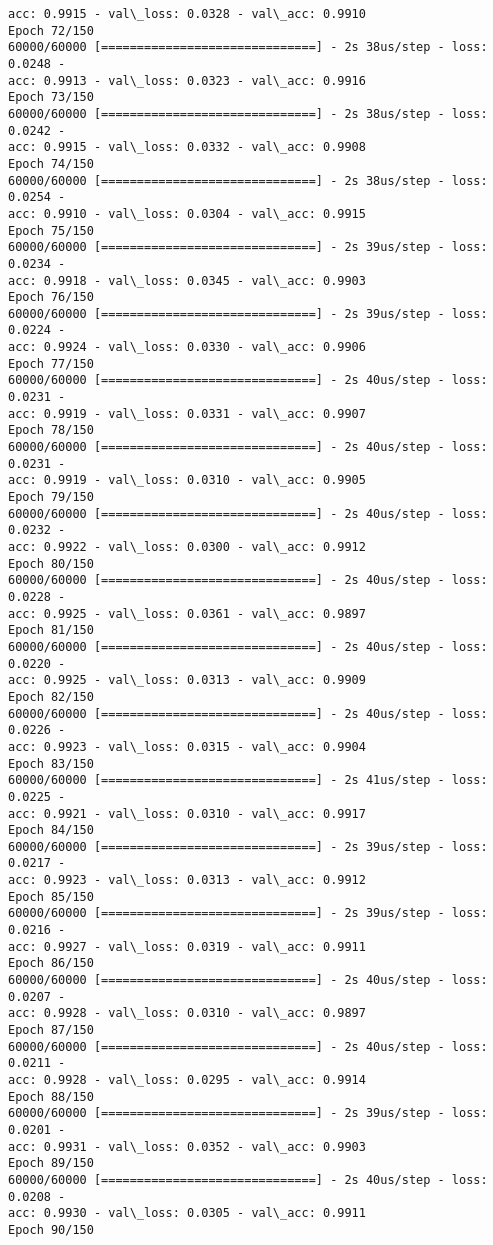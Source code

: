\documentclass[11pt]{article}
\begin{document}
\begin{Verbatim}[commandchars=\\\{\}]
acc: 0.9915 - val\_loss: 0.0328 - val\_acc: 0.9910
Epoch 72/150
60000/60000 [==============================] - 2s 38us/step - loss: 0.0248 -
acc: 0.9913 - val\_loss: 0.0323 - val\_acc: 0.9916
Epoch 73/150
60000/60000 [==============================] - 2s 38us/step - loss: 0.0242 -
acc: 0.9915 - val\_loss: 0.0332 - val\_acc: 0.9908
Epoch 74/150
60000/60000 [==============================] - 2s 38us/step - loss: 0.0254 -
acc: 0.9910 - val\_loss: 0.0304 - val\_acc: 0.9915
Epoch 75/150
60000/60000 [==============================] - 2s 39us/step - loss: 0.0234 -
acc: 0.9918 - val\_loss: 0.0345 - val\_acc: 0.9903
Epoch 76/150
60000/60000 [==============================] - 2s 39us/step - loss: 0.0224 -
acc: 0.9924 - val\_loss: 0.0330 - val\_acc: 0.9906
Epoch 77/150
60000/60000 [==============================] - 2s 40us/step - loss: 0.0231 -
acc: 0.9919 - val\_loss: 0.0331 - val\_acc: 0.9907
Epoch 78/150
60000/60000 [==============================] - 2s 40us/step - loss: 0.0231 -
acc: 0.9919 - val\_loss: 0.0310 - val\_acc: 0.9905
Epoch 79/150
60000/60000 [==============================] - 2s 40us/step - loss: 0.0232 -
acc: 0.9922 - val\_loss: 0.0300 - val\_acc: 0.9912
Epoch 80/150
60000/60000 [==============================] - 2s 40us/step - loss: 0.0228 -
acc: 0.9925 - val\_loss: 0.0361 - val\_acc: 0.9897
Epoch 81/150
60000/60000 [==============================] - 2s 40us/step - loss: 0.0220 -
acc: 0.9925 - val\_loss: 0.0313 - val\_acc: 0.9909
Epoch 82/150
60000/60000 [==============================] - 2s 40us/step - loss: 0.0226 -
acc: 0.9923 - val\_loss: 0.0315 - val\_acc: 0.9904
Epoch 83/150
60000/60000 [==============================] - 2s 41us/step - loss: 0.0225 -
acc: 0.9921 - val\_loss: 0.0310 - val\_acc: 0.9917
Epoch 84/150
60000/60000 [==============================] - 2s 39us/step - loss: 0.0217 -
acc: 0.9923 - val\_loss: 0.0313 - val\_acc: 0.9912
Epoch 85/150
60000/60000 [==============================] - 2s 39us/step - loss: 0.0216 -
acc: 0.9927 - val\_loss: 0.0319 - val\_acc: 0.9911
Epoch 86/150
60000/60000 [==============================] - 2s 40us/step - loss: 0.0207 -
acc: 0.9928 - val\_loss: 0.0310 - val\_acc: 0.9897
Epoch 87/150
60000/60000 [==============================] - 2s 40us/step - loss: 0.0211 -
acc: 0.9928 - val\_loss: 0.0295 - val\_acc: 0.9914
Epoch 88/150
60000/60000 [==============================] - 2s 39us/step - loss: 0.0201 -
acc: 0.9931 - val\_loss: 0.0352 - val\_acc: 0.9903
Epoch 89/150
60000/60000 [==============================] - 2s 40us/step - loss: 0.0208 -
acc: 0.9930 - val\_loss: 0.0305 - val\_acc: 0.9911
Epoch 90/150

\end{Verbatim}
\end{document}
